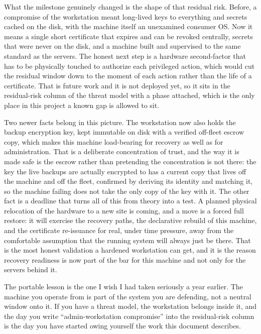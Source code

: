 \documentclass[12pt]{article}
\begin{document}
What the milestone genuinely changed is the shape of that residual risk. Before, a compromise of the workstation meant long-lived keys to everything and secrets cached on the disk, with the machine itself an unexamined consumer OS. Now it means a single short certificate that expires and can be revoked centrally, secrets that were never on the disk, and a machine built and supervised to the same standard as the servers. The honest next step is a hardware second-factor that has to be physically touched to authorize each privileged action, which would cut the residual window down to the moment of each action rather than the life of a certificate. That is future work and it is not deployed yet, so it sits in the residual-risk column of the threat model with a phase attached, which is the only place in this project a known gap is allowed to sit.

Two newer facts belong in this picture. The workstation now also holds the backup encryption key, kept immutable on disk with a verified off-fleet escrow copy, which makes this machine load-bearing for recovery as well as for administration. That is a deliberate concentration of trust, and the way it is made safe is the escrow rather than pretending the concentration is not there: the key the live backups are actually encrypted to has a current copy that lives off the machine and off the fleet, confirmed by deriving its identity and matching it, so the machine failing does not take the only copy of the key with it. The other fact is a deadline that turns all of this from theory into a test. A planned physical relocation of the hardware to a new site is coming, and a move is a forced full restore: it will exercise the recovery paths, the declarative rebuild of this machine, and the certificate re-issuance for real, under time pressure, away from the comfortable assumption that the running system will always just be there. That is the most honest validation a hardened workstation can get, and it is the reason recovery readiness is now part of the bar for this machine and not only for the servers behind it.

The portable lesson is the one I wish I had taken seriously a year earlier. The machine you operate from is part of the system you are defending, not a neutral window onto it. If you have a threat model, the workstation belongs inside it, and the day you write ``admin-workstation compromise'' into the residual-risk column is the day you have started owing yourself the work this document describes.
\end{document}
